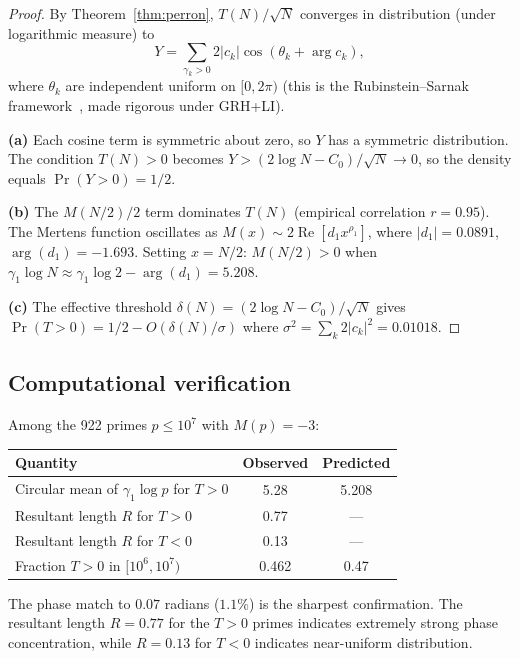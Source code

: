 \documentclass[11pt]{article}
\theoremstyle{definition}
\begin{document}
\begin{proof}
By Theorem~\ref{thm:perron}, $T(N)/\sqrt{N}$ converges in distribution
(under logarithmic measure) to
\[
  Y = \sum_{\gamma_k > 0} 2|c_k|\cos(\theta_k + \arg c_k),
\]
where $\theta_k$ are independent uniform on $[0, 2\pi)$ (this is the
Rubinstein--Sarnak framework~\cite{RubinsteinSarnak1994}, made rigorous
under GRH+LI).

\textbf{(a)} Each cosine term is symmetric about zero, so $Y$ has a
symmetric distribution.  The condition $T(N) > 0$ becomes
$Y > (2\log N - C_0)/\sqrt{N} \to 0$, so the density equals
$\Pr(Y > 0) = 1/2$.

\textbf{(b)} The $M(N/2)/2$ term dominates $T(N)$ (empirical
correlation $r = 0.95$).  The Mertens function oscillates as
$M(x) \sim 2\operatorname{Re}[d_1 x^{\rho_1}]$, where
$|d_1| = 0.0891$, $\arg(d_1) = -1.693$.  Setting $x = N/2$:
$M(N/2) > 0$ when
$\gamma_1 \log N \approx \gamma_1 \log 2 - \arg(d_1) = 5.208$.

\textbf{(c)} The effective threshold
$\delta(N) = (2\log N - C_0)/\sqrt{N}$ gives
$\Pr(T > 0) = 1/2 - O(\delta(N)/\sigma)$ where
$\sigma^2 = \sum_k 2|c_k|^2 = 0.01018$.
\end{proof}

\subsection{Computational verification}

Among the 922 primes $p \le 10^7$ with $M(p) = -3$:

\begin{center}
\begin{tabular}{lcc}
\toprule
Quantity & Observed & Predicted \\
\midrule
Circular mean of $\gamma_1 \log p$ for $T > 0$ & 5.28 & 5.208 \\
Resultant length $R$ for $T > 0$ & 0.77 & --- \\
Resultant length $R$ for $T < 0$ & 0.13 & --- \\
Fraction $T > 0$ in $[10^6, 10^7)$ & 0.462 & 0.47 \\
\bottomrule
\end{tabular}
\end{center}

The phase match to $0.07$ radians ($1.1\%$) is the sharpest confirmation.
The resultant length $R = 0.77$ for the $T > 0$ primes indicates
extremely strong phase concentration, while $R = 0.13$ for $T < 0$
indicates near-uniform distribution.
\end{document}
